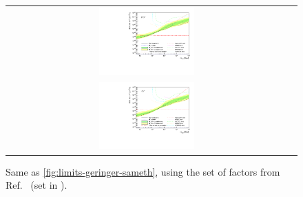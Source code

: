 \begin{figure}[ht]
{\begin{tabular}{cc}
    \includegraphics[width=0.35\textwidth]{figures/glory_duck/limits/Glory_Duck_Annihilation_mumu_Bonnivard_Combination_bands.pdf} \\
    \includegraphics[width=0.35\textwidth]{figures/glory_duck/limits/Glory_Duck_Annihilation_tautau_Bonnivard_Combination_bands.pdf} &
    \end{tabular}
    }
    \caption{Same as \cref{fig:limits-geringer-sameth}, using the set of \J factors from Ref.~\cite{Bonnivard:2014kza, Bonnivard:2015xpq} (\B set in ).}
\label{fig:limits-bonnivard}
\end{figure}

